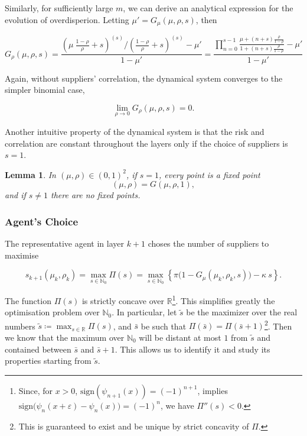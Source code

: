 \documentclass[american, abstract=on]{scrartcl}
\theoremstyle{plain}
\newtheorem{lemma}{Lemma}
\renewcommand{\Re}{\mathbb{R}}
\begin{document}
Similarly, for sufficiently large $m$, we can derive an analytical expression for the evolution of overdisperion. Letting $\mu' = G_\mu(\mu, \rho, s)$, then

\begin{equation}
  G_\rho(\mu, \rho, s) = \frac{\left( \mu \  \frac{1 - \rho}{\rho} + s \right)^{(s)} \Big/ \left( \frac{1 - \rho}{\rho} + s \right)^{(s)} - \mu'}{1 - \mu'} = \frac{\prod^{s - 1}_{n = 0} \frac{\mu + (n + s) \frac{\rho}{1 - \rho}}{1 + (n + s) \frac{\rho}{1 - \rho}} - \mu'}{1 - \mu'}
\end{equation}



Again, without suppliers' correlation, the dynamical system converges to the simpler binomial case,

\begin{equation}
  \lim_{\rho \rightarrow 0} G_\rho(\mu, \rho, s) = 0.
\end{equation}

Another intuitive property of the dynamical system is that the risk and correlation are constant throughout the layers only if the choice of suppliers is $s = 1$. 

\begin{lemma}
  In $(\mu, \rho) \in (0, 1)^2$, if $s = 1$, every point is a fixed point \begin{equation}
    (\mu, \rho) = G(\mu, \rho, 1),  
  \end{equation} and if $s \neq 1$ there are no fixed points.
\end{lemma}

\subsubsection{Agent's Choice}

The representative agent in layer $k + 1$ choses the number of suppliers to maximise

\begin{equation}
  s_{k + 1}(\mu_k, \rho_k) = \max_{s \in \mathbb{N}_0} \Pi(s) =\max_{s \in \mathbb{N}_0} \left\{ \pi \Big(1 - G_{\mu}(\mu_k, \rho_k, s)\Big) - \kappa \  s \right\}.
\end{equation}

The function $\Pi(s)$ is strictly concave over $\Re$\footnote{
  Since, for $x > 0$, $\text{sign}(\psi_{n + 1}(x)) = (-1)^{n + 1}$, implies $\text{sign}\big(\psi_n(x + \varepsilon) - \psi_n(x) \big) = (-1)^n$, we have $\Pi''(s) < 0$.
}. This simplifies greatly the optimisation problem over $\mathbb{N}_0$. In particular, let $\tilde{s}$ be the maximizer over the real numbers $\tilde{s} \coloneqq \max_{s \in \mathbb{R}} \Pi(s)$, and $\bar{s}$ be such that $\Pi(\bar{s}) = \Pi(\bar{s} + 1)$\footnote{This is guaranteed to exist and be unique by strict concavity of $\Pi$.}. Then we know that the maximum over $\mathbb{N}_0$ will be distant at most $1$ from $\tilde{s}$ and contained between $\bar{s}$ and $\bar{s} + 1$. This allows us to identify it and study its properties starting from $\tilde{s}$.
\end{document}

